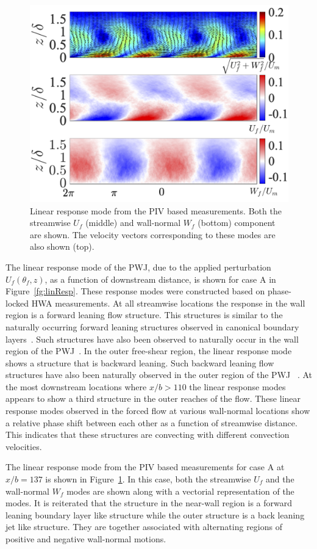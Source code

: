 \begin{figure}[h]
	\centering
	\includegraphics[width=.8\textwidth]{pics/linearResponse137.png}
	\caption{Linear response mode from the PIV based measurements. Both the streamwise $U_f$ (middle) and wall-normal $W_f$ (bottom) component are shown. The velocity vectors corresponding to these modes are also shown (top). }
	\label{fg:linResp137}
\end{figure}

The linear response mode of the PWJ, due to the applied perturbation $U_f(\theta_f,z)$, as a function of downstream distance, is shown for case A in Figure~\ref{fg:linResp}. These response modes were constructed based on phase-locked HWA measurements. At all streamwise locations the response in the wall region is a forward leaning flow structure. This structures is similar to the naturally occurring forward leaning structures observed in canonical boundary layers~\citep{Tutkun2009a}. Such structures have also been observed to naturally occur in the wall region of the PWJ~\citep{Banyassady2014a}. In the outer free-shear region, the linear response mode shows a structure that is backward leaning. Such backward leaning flow structures have also been naturally observed in the outer region of the PWJ ~\citep{Banyassady2014a}. At the most downstream locations where $x/b>110$ the linear response modes appears to show a third structure in the outer reaches of the flow. These linear response modes observed in the forced flow at various wall-normal locations show a relative phase shift between each other as a function of streamwise distance. This indicates that these structures are convecting with different convection velocities.

The linear response mode from the PIV based measurements for case A at $x/b=137$ is shown in Figure~\ref{fg:linResp137}. In this case, both the streamwise $U_f$ and the wall-normal $W_f$ modes are shown along with a vectorial representation of the modes. It is reiterated that the structure in the near-wall region is a forward leaning boundary layer like structure while the outer structure is a back leaning jet like structure. They are together associated with alternating regions of positive and negative wall-normal motions. 

